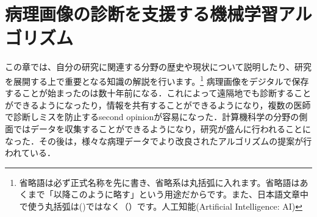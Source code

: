 \chapter{病理画像の診断を支援する機械学習アルゴリズム}
\label{chap_review}

この章では、自分の研究に関連する分野の歴史や現状について説明したり、研究を展開する上で重要となる知識の解説を行います。\footnote{省略語は必ず正式名称を先に書き、省略系は丸括弧に入れます。省略語はあくまで「以降このように略す」という用途だからです。また、日本語文章中で使う丸括弧は()ではなく（）です。人工知能(Artificial Intelligence: AI)}
病理画像をデジタルで保存することが始まったのは数十年前になる．これによって遠隔地でも診断することができるようになったり，情報を共有することができるようになり，複数の医師で診断しミスを防止するsecond opinionが容易になった．計算機科学の分野の側面ではデータを収集することができるようになり，研究が盛んに行われることになった．その後は，様々な病理データでより改良されたアルゴリズムの提案が行われている．

